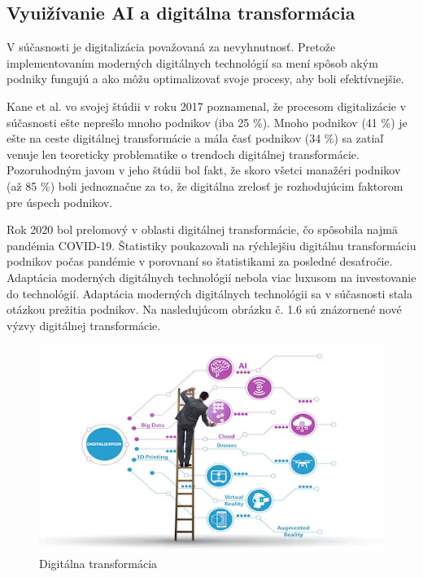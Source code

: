 
\subsection{Vyuižívanie AI a digitálna transformácia}

V súčasnosti je digitalizácia považovaná za nevyhnutnosť. Pretože implementovaním moderných digitálnych technológií sa mení spôsob akým podniky fungujú a ako môžu optimalizovať svoje procesy, aby boli efektívnejšie.
\par Kane et al. vo svojej štúdii v roku 2017 poznamenal, že procesom digitalizácie v súčasnosti ešte neprešlo mnoho podnikov (iba 25 \%).  Mnoho podnikov (41 \%) je ešte na ceste digitálnej transformácie a mála časť podnikov (34 \%) sa zatiaľ venuje len teoreticky problematike o trendoch digitálnej transformácie.  Pozoruhodným javom v jeho štúdii bol fakt, že skoro všetci manažéri podnikov (až 85 \%) boli jednoznačne za to, že digitálna zrelosť je rozhodujúcim faktorom pre úspech podnikov. \cite{holmstrom2022}
\par Rok 2020 bol prelomový v oblasti digitálnej transformácie, čo spôsobila najmä pandémia COVID-19.  Štatistiky poukazovali na rýchlejšiu digitálnu transformáciu podnikov počas pandémie v porovnaní so štatistikami za posledné desaťročie.  Adaptácia moderných digitálnych technológií nebola viac luxusom na investovanie do technológií. Adaptácia moderných digitálnych technológii sa v súčasnosti stala otázkou prežitia podnikov. \cite{aspecta_trendy_2021} Na nasledujúcom obrázku č. 1.6 sú znázornené nové výzvy digitálnej transformácie. 


\begin{figure}[!ht]
    \centering
    \includegraphics[width=1\textwidth]{figures/digitalna-transformacia.png}
    \caption{Digitálna transformácia}
\end{figure}

